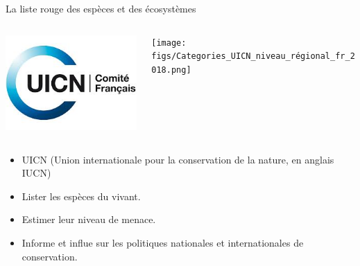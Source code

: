 \documentclass[10pt,table,dvipsnames,compress]{beamer}
\begin{document}
\begin{frame}[label={sec:org7bb747e}]{La liste rouge des espèces et des écosystèmes}
\begin{columns}
\begin{column}{0.5\columnwidth}
\begin{center}
\includegraphics[width=\textwidth]{figs/iucn-logo.jpg}
\end{center}
\end{column}
\begin{column}{0.5\columnwidth}
\begin{center}
\texttt{[image: figs/Categories\_UICN\_niveau\_régional\_fr\_2018.png]}
\end{center}
\end{column}
\end{columns}
\begin{itemize}
\item UICN (Union internationale pour la conservation de la nature, en anglais IUCN)
\item Lister les espèces du vivant.
\item Estimer leur niveau de menace.
\item Informe et influe sur les politiques nationales et internationales de conservation.
\end{itemize}
\end{frame}
\end{document}
